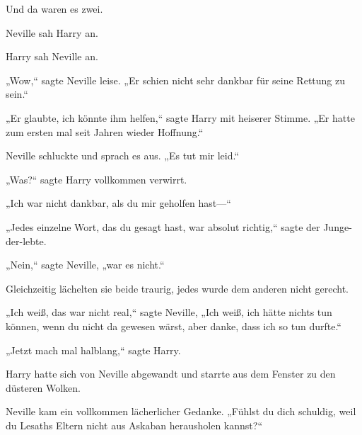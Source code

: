 Und da waren es zwei.

Neville sah Harry an.

Harry sah Neville an.

„Wow,“ sagte Neville leise. „Er schien nicht sehr dankbar für seine Rettung zu sein.“

„Er glaubte, ich könnte ihm helfen,“ sagte Harry mit heiserer Stimme. „Er hatte zum ersten mal seit Jahren wieder Hoffnung.“

Neville schluckte und sprach es aus. „Es tut mir leid.“

„Was?“ sagte Harry vollkommen verwirrt.

„Ich war nicht dankbar, als du mir geholfen hast—“

„Jedes einzelne Wort, das du gesagt hast, war absolut richtig,“ sagte der Junge-der-lebte.

„Nein,“ sagte Neville, „war es nicht.“

Gleichzeitig lächelten sie beide traurig, jedes wurde dem anderen nicht gerecht.

„Ich weiß, das war nicht real,“ sagte Neville, „Ich weiß, ich hätte nichts tun können, wenn du nicht da gewesen wärst, aber danke, dass ich so tun durfte.“

„Jetzt mach mal halblang,“ sagte Harry.

Harry hatte sich von Neville abgewandt und starrte aus dem Fenster zu den düsteren Wolken.

Neville kam ein vollkommen lächerlicher Gedanke. „Fühlst du dich schuldig, weil du Lesaths Eltern nicht aus Askaban herausholen kannst?“

